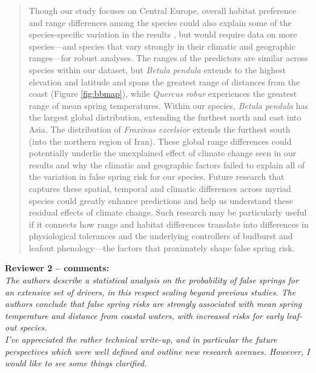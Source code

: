 \documentclass[11pt,a4paper]{article}\usepackage[]{graphicx}\usepackage[]{color}
\begin{document}
\begin{quotation}
\noindent  Though our study focuses on Central Europe, overall habitat preference and range differences among the species could also explain some of the species-specific variation in the results \citep{Chuine2001}, but would require data on more species---and species that vary strongly in their climatic and geographic ranges---for robust analyses. The ranges of the predictors are similar across species within our dataset, but \textit{Betula pendula} extends to the highest elevation and latitude and spans the greatest range of distances from the coast (Figure \ref{fig:bbmap}), while \textit{Quercus robur} experiences the greatest range of mean spring temperatures. Within our species, \textit{Betula pendula} has the largest global distribution, extending the furthest north and east into Asia. The distribution of \textit{Fraxinus excelsior} extends the furthest south (into the northern region of Iran). These global range differences could potentially underlie the unexplained effect of climate change seen in our results and why the climatic and geographic factors failed to explain all of the variation in false spring risk for our species. Future research that captures these spatial, temporal and climatic differences across myriad species could greatly enhance predictions and help us understand these residual effects of climate change. Such research may be particularly useful if it connects how range and habitat differences translate into differences in physiological tolerances and the underlying controllers of budburst and leafout phenology---the factors that proximately shape false spring risk. 
\end{quotation}


\textbf {Reviewer 2 -- comments:} \\


\textit{The authors describe a statistical analysis on the probability of false springs for an extensive set of drivers, in this respect scaling beyond previous studies. The authors conclude that false spring risks are strongly associated with mean spring temperature and distance from coastal waters, with increased risks for early leaf-out species.} \\

\textit{I've appreciated the rather technical write-up, and in particular the future perspectives which were well defined and outline new research avenues. However, I would like to see some things clarified.} \\
\end{document}
